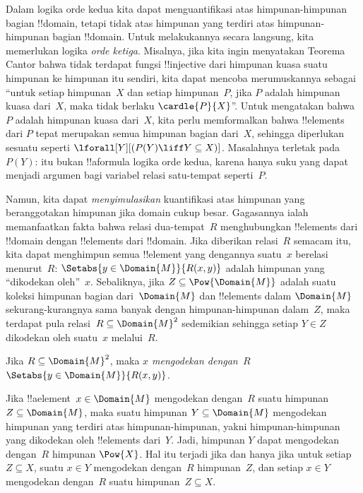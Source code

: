 \documentclass[../../../include/open-logic-section]{subfiles}
\begin{document}


\begin{explain}
Dalam logika orde kedua kita dapat menguantifikasi atas himpunan-himpunan
bagian !!{domain}, tetapi tidak atas himpunan yang terdiri atas
himpunan-himpunan bagian !!{domain}. Untuk melakukannya secara langsung,
kita memerlukan logika \emph{orde ketiga}. Misalnya, jika kita ingin
menyatakan Teorema Cantor bahwa tidak terdapat fungsi !!{injective} dari
himpunan kuasa suatu himpunan ke himpunan itu sendiri, kita dapat mencoba
merumuskannya sebagai ``untuk setiap himpunan~$X$ dan setiap himpunan~$P$,
jika $P$ adalah himpunan kuasa dari~$X$, maka tidak berlaku
$\cardle{P}{X}$''. Untuk mengatakan bahwa $P$ adalah himpunan kuasa dari~$X$,
kita perlu memformalkan bahwa !!{element}s dari $P$ tepat merupakan semua
himpunan bagian dari~$X$, sehingga diperlukan sesuatu seperti
$\lforall[Y][(P(Y) \liff Y \subseteq X)]$. Masalahnya terletak pada $P(Y)$:
itu bukan !!a{formula} logika orde kedua, karena hanya suku yang dapat menjadi
argumen bagi variabel relasi satu-tempat seperti~$P$.

Namun, kita dapat \emph{menyimulasikan} kuantifikasi atas himpunan yang
beranggotakan himpunan jika domain cukup besar. Gagasannya ialah memanfaatkan
fakta bahwa
relasi dua-tempat~$R$ menghubungkan !!{element}s dari !!{domain} dengan
!!{element}s dari !!{domain}. Jika diberikan relasi~$R$ semacam itu, kita
dapat menghimpun semua !!{element} yang dengannya suatu~$x$ berelasi
menurut~$R$:
$\Setabs{y \in \Domain{M}}{R(x,y)}$ adalah himpunan yang ``dikodekan
oleh''~$x$. Sebaliknya, jika $Z \subseteq \Pow{\Domain{M}}$ adalah suatu
koleksi himpunan bagian dari~$\Domain{M}$ dan !!{element}s dalam
$\Domain{M}$ sekurang-kurangnya sama banyak dengan himpunan-himpunan
dalam~$Z$, maka terdapat pula relasi~$R \subseteq \Domain{M}^2$ sedemikian
sehingga setiap $Y \in Z$ dikodekan oleh suatu~$x$ melalui~$R$.
\end{explain}

\begin{defn}
Jika $R \subseteq \Domain{M}^2$, maka \emph{$x$ mengodekan dengan~$R$}
$\Setabs{y \in \Domain{M}}{R(x, y)}$.
\end{defn}

Jika !!a{element}~$x \in \Domain{M}$ mengodekan dengan~$R$ suatu himpunan
$Z \subseteq \Domain{M}$, maka suatu himpunan $Y \subseteq \Domain{M}$
mengodekan himpunan yang terdiri atas himpunan-himpunan, yakni
himpunan-himpunan yang dikodekan oleh !!{element}s dari~$Y$. Jadi, himpunan
$Y$ dapat mengodekan dengan~$R$ himpunan $\Pow{X}$. Hal itu terjadi jika dan
hanya jika untuk setiap $Z \subseteq X$, suatu $x \in Y$ mengodekan
dengan~$R$ himpunan~$Z$, dan setiap $x \in Y$ mengodekan dengan~$R$ suatu
himpunan~$Z \subseteq X$.
\end{document}
